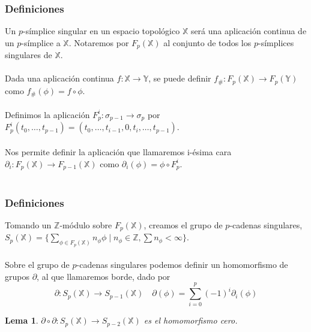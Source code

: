 \documentclass{beamer}
\def\X{{\mathbb X}}
\def\Y{{\mathbb Y}}
\theoremstyle{theorem}
\newtheorem{mylemma}{Lema}
\begin{document}

\begin{frame}
  \frametitle{Definiciones}
  Un $p$-símplice singular en un espacio topológico $\X$ será una aplicación continua de un $p$-símplice a $\X$.
  Notaremos por $F_p(\X)$ al conjunto de todos los $p$-símplices singulares de $\X$. \\~\\

  Dada una aplicación continua $f \colon \X \to \Y$, se puede definir $f_\# \colon F_p(\X) \to F_p(\Y)$ como
  $f_\#(\phi) = f \circ \phi$. \\~\\

  Definimos la aplicación $F^i_p \colon \sigma_{p-1} \to \sigma_p$ por $F^i_p(t_0, \dots, t_{p-1}) =
  (t_0, \dots, t_{i-1}, 0, t_i, \dots, t_{p-1})$. \\~\\

  Nos permite definir la aplicación que llamaremos i-ésima cara $\partial_i \colon F_p(\X) \to F_{p-1}(\X)$ como
  $\partial_i(\phi) = \phi \circ F^i_p$. \\~\\

\end{frame}



\begin{frame}
  \frametitle{Definiciones}
  Tomando un $\mathbb{Z}$-módulo sobre $F_p(\X)$, creamos el grupo de $p$-cadenas singulares,
  $S_p(\X) = \{\sum\limits_{\phi \in F_p(\X)} n_{\phi} \phi \mid n_{\phi} \in \mathbb Z,  \sum n_\phi < \infty\}$. \\~\\

  Sobre el grupo de $p$-cadenas singulares podemos definir un homomorfismo de grupos $\partial$, al que llamaremos borde, dado por
  \[ \partial \colon S_p(\X) \to S_{p-1}(\X) \quad \partial(\phi) = \sum\limits_{i = 0}^p (-1)^i \partial_i(\phi) \]
  \begin{mylemma}
      $\partial \circ \partial \colon S_p(\X) \to S_{p-2}(\X)$ es el homomorfismo cero.
  \end{mylemma}

\end{frame}

\end{document}
